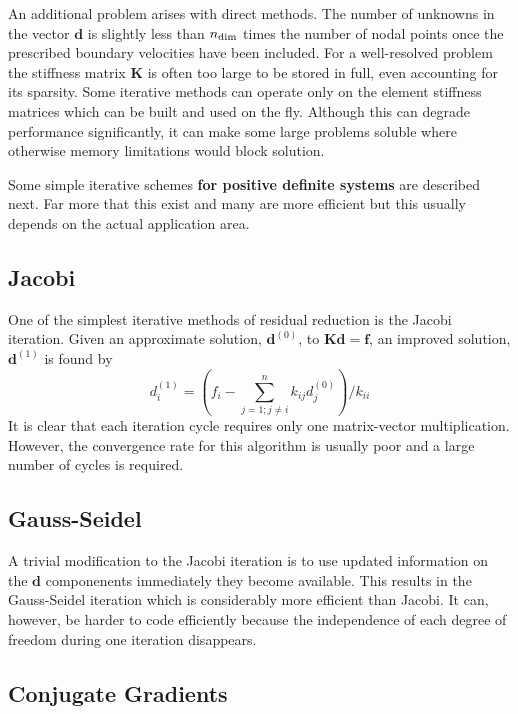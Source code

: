 \documentclass[10pt]{article}
\begin{document}
	An additional problem arises with direct methods. The number of unknowns in the vector $\mathbf{d}$ is slightly
	less than $n_{\rm dim}$ times the number of nodal points once the prescribed
	boundary velocities have been included. For a well-resolved problem
	the stiffness matrix $\mathbf{K}$ is often too large to be stored in full, even accounting
	for its sparsity. Some iterative methods can operate only on the element stiffness matrices
	which can be built and used on the fly. Although this can degrade performance significantly, 
	it can make some large problems soluble where otherwise memory limitations
	would block solution.
	
	Some simple iterative schemes {\bf for positive definite systems} are 
	described next. Far more that this exist and many are more efficient
	but this usually depends on the actual application area.
	
	\subsection{Jacobi}
	
		One of the simplest iterative methods of residual reduction is the Jacobi iteration.
		Given an approximate solution, $\mathbf{d}^{(0)}$, to $\mathbf{Kd}=\mathbf{f}$,
		 an improved solution, $ \mathbf{d}^{(1)}$
		is found by
		\begin{equation}
		  d_i^{(1)} = \left( f_i - \sum^{n}_{j=1;j\not=i} k_{ij}d_j^{(0)} \right) / k_{ii}
		\end{equation}
		It is clear that each iteration cycle requires only one matrix-vector multiplication.
		 However, the convergence rate for this algorithm is usually
		poor and a large number of cycles is required.
		
	\subsection{Gauss-Seidel}
	
		A trivial modification to the Jacobi iteration is to use updated information
		on the $\mathbf{d}$ componenents immediately they become available. This
		results in the Gauss-Seidel iteration which is considerably more efficient than
		Jacobi. It can, however, be harder to code efficiently because the 
		independence of each degree of freedom during one iteration disappears.	
	
	\subsection{Conjugate Gradients}
	
\end{document}
